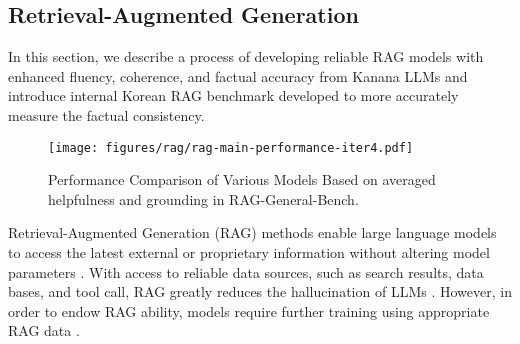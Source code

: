 \subsection{Retrieval-Augmented Generation}
In this section, we describe a process of developing reliable RAG models with enhanced fluency, coherence, and factual accuracy from Kanana LLMs and introduce internal Korean RAG benchmark developed to more accurately measure the factual consistency.


\begin{figure}[h]
    \small
    \centering
    \texttt{[image: figures/rag/rag-main-performance-iter4.pdf]}
    \caption{Performance Comparison of Various Models Based on averaged helpfulness and grounding in RAG-General-Bench.}
    \label{fig:rag-main-performance}
\end{figure}
Retrieval-Augmented Generation (RAG) methods \citep{lewis2021retrievalaugmentedgenerationknowledgeintensivenlp} enable large language models to access the latest external or proprietary information without altering model parameters \citep{liu2024chatqasurpassinggpt4conversational}.
With access to reliable data sources, such as search results, data bases, and tool call, RAG greatly reduces the hallucination of LLMs \citep{Shuster2021RetrievalAR}.
However, in order to endow RAG ability, models require further training using appropriate RAG data \citep{lin2024flamefactualityawarealignmentlarge}.

